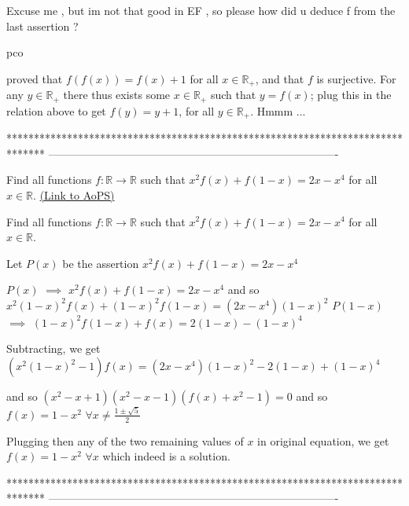 \begin{solution}
	Excuse me , but im not that good in EF , so please how did u deduce f from the last assertion ?
\end{solution}



\begin{solution}
	\begin{bolded}pco\end{bolded} proved that $f(f(x))=f(x)+1$ for all $x \in \mathbb{R}_+$, and that $f$ is surjective. For any $y \in \mathbb{R}_+$ there thus exists some $x \in \mathbb{R}_+$ such that $y=f(x)$; plug this in the relation above to get $f(y) =y+1$, for all $y \in \mathbb{R}_+$. Hmmm ...
\end{solution}
*******************************************************************************
-------------------------------------------------------------------------------

\begin{problem}
	Find all functions $f:\mathbb{R}\to\mathbb{R}$ such that $x^2f(x)+f(1-x)=2x-x^4$ for all $x\in \mathbb{R}$.
	\flushright \href{https://artofproblemsolving.com/community/c6h450676}{(Link to AoPS)}
\end{problem}



\begin{solution}
	\begin{tcolorbox}Find all functions $f:\mathbb{R}\to\mathbb{R}$ such that $x^2f(x)+f(1-x)=2x-x^4$ for all $x\in \mathbb{R}$.\end{tcolorbox}
Let $P(x)$ be the assertion $x^2f(x)+f(1-x)=2x-x^4$

$P(x)$ $\implies$ $x^2f(x)+f(1-x)=2x-x^4$ and so $x^2(1-x)^2f(x)+(1-x)^2f(1-x)=(2x-x^4)(1-x)^2$ 
$P(1-x)$ $\implies$ $(1-x)^2f(1-x)+f(x)=2(1-x)-(1-x)^4$

Subtracting, we get $(x^2(1-x)^2-1)f(x)=(2x-x^4)(1-x)^2-2(1-x)+(1-x)^4$

and so $(x^2-x+1)(x^2-x-1)(f(x)+x^2-1)=0$ and so $f(x)=1-x^2$ $\forall x\ne\frac{1\pm\sqrt 5}2$

Plugging then any of the two remaining values of $x$ in original equation, we get $\boxed{f(x)=1-x^2}$ $\forall x$ which indeed is a solution.
\end{solution}
*******************************************************************************
-------------------------------------------------------------------------------

